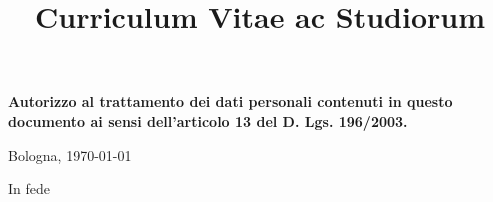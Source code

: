 \documentclass[12pt,a4paper]{moderncv} %
\title{Curriculum Vitae ac Studiorum}
\begin{document}
  \ifdefined\eng
  \else
  \fi
  
  \makecvtitle %

  

  
  
  

  

  

  

  

  

  
  


  \vspace*{\fill}
  \textbf{Autorizzo al trattamento dei dati personali contenuti in questo documento ai sensi dell'articolo 13 del D. Lgs. 196/2003.}

  \begin{flushright}
    Bologna, \today

   {
    In fede
  }{}

  \vspace*{0.5cm}


  \end{flushright}
\end{document}
